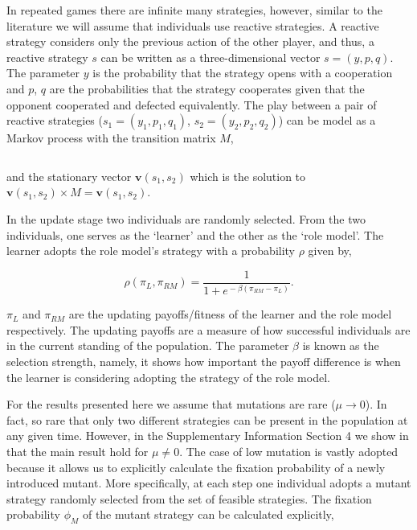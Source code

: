 \documentclass[11pt]{article}
\theoremstyle{plainCl1}
\theoremstyle{plainCl2}
\begin{document}
In repeated games there are infinite many strategies, however, similar to the
literature we will assume that individuals use reactive strategies. A reactive
strategy considers only the previous action of the other player, and thus, a
reactive strategy \(s\) can be written as a three-dimensional vector \(s=(y, p,
q)\). The parameter \(y\) is the probability that the strategy opens with a
cooperation and \(p\), \(q\) are the probabilities that the strategy cooperates
given that the opponent cooperated and defected equivalently. The play between a
pair of reactive strategies ($s_1 = (y_1, p_1, q_1)$, $s_2 = (y_2, p_2, q_2)$)
can be model as a Markov process with the transition matrix \(M\),

\begin{equation}\label{eq:transition_matrix}
  
\end{equation}

and the stationary vector \(\mathbf{v}(s_1,s_2)\)
which is the solution to \(\mathbf{v}(s_1,s_2) \times M 
= \mathbf{v}(s_1,s_2)\).

In the update stage two individuals are randomly selected. From the two
individuals, one  serves as the `learner' and the other as the `role model'. The
learner adopts the role model's strategy with a probability \(\rho\) given by,

\begin{equation} \label{Eq:rho}
    \rho(\pi_{L}, \pi_{RM}) = \frac{1}{1\!+\! e^{\!-\!\beta (\pi_{RM}\!-\! \pi_{L})}}.
\end{equation}

\(\pi_{L}\) and \(\pi_{RM}\) are the updating payoffs/fitness of the learner and the
role model respectively. The updating payoffs are a measure of how successful
individuals are in the current standing of the population. The parameter
\(\beta\) is known as the selection strength, namely, it shows how important the
payoff difference is when the learner is considering adopting the strategy of
the role model.

For the results presented here we assume that mutations are rare (\(\mu
\rightarrow 0\)). In fact, so rare that only two different strategies can be
present in the population at any given time. However, in the Supplementary Information
Section 4 we show in that the main result hold for \(\mu \neq 0\).
The case of low mutation is vastly adopted because it allows us to explicitly
calculate the fixation probability of a newly introduced mutant. More specifically,
at each step
one individual adopts a mutant strategy randomly selected from the set of
feasible strategies. The fixation probability \(\phi_{M}\) of the mutant
strategy can be calculated explicitly,
\end{document}
